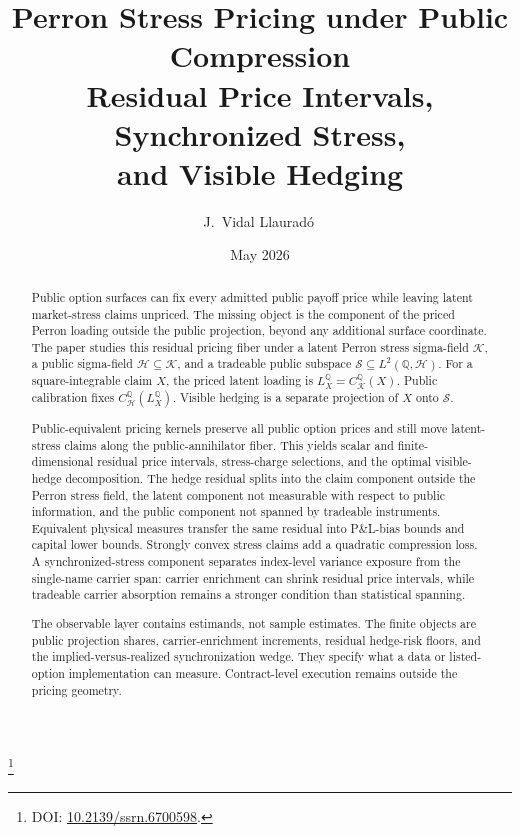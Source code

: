 \documentclass[11pt,a4paper]{amsart}
\theoremstyle{plain}
\theoremstyle{definition}
\theoremstyle{remark}
\newcommand{\QQ}{\mathbb{Q}}
\newcommand{\cH}{\mathcal{H}}
\newcommand{\cK}{\mathcal{K}}
\newcommand{\cS}{\mathcal{S}}
\begin{document}
\title[Perron Stress Pricing]{%
Perron Stress Pricing under Public Compression\\[0.3em]
{\small Residual Price Intervals, Synchronized Stress,\\[0.1em] and Visible Hedging}}
\author[J.~Vidal Llaurad\'o]{J.~Vidal Llaurad\'o\,}
\thanks{DOI: \href{https://doi.org/10.2139/ssrn.6700598}{10.2139/ssrn.6700598}.}
\date{May 2026}

\begin{abstract}
Public option surfaces can fix every admitted public payoff price while leaving latent
market-stress claims unpriced.  The missing object is the component of the priced Perron loading
outside the public projection, beyond any additional surface coordinate.  The paper studies this
residual pricing fiber under a latent Perron stress sigma-field \(\cK\), a public sigma-field
\(\cH\subseteq\cK\), and a tradeable public subspace \(\cS\subseteq L^2(\QQ,\cH)\).  For a
square-integrable claim \(X\), the priced latent loading is \(L_X^\QQ=C_{\cK}^{\QQ}(X)\).  Public
calibration fixes \(C_{\cH}^{\QQ}(L_X^\QQ)\).  Visible hedging is a separate projection of \(X\)
onto \(\cS\).

Public-equivalent pricing kernels preserve all public option prices and still move latent-stress
claims along the public-annihilator fiber.  This yields scalar and finite-dimensional residual price
intervals, stress-charge selections, and the optimal visible-hedge decomposition.  The hedge
residual splits into the claim component outside the Perron stress field, the latent component not
measurable with respect to public information, and the public component not spanned by tradeable
instruments.  Equivalent physical measures transfer the same residual into P\&L-bias bounds and
capital lower bounds.  Strongly convex stress claims add a quadratic compression loss.  A
synchronized-stress component separates index-level variance exposure from the single-name carrier
span: carrier enrichment can shrink residual price intervals, while tradeable carrier absorption
remains a stronger condition than statistical spanning.

The observable layer contains estimands, not sample estimates.  The finite objects are public
projection shares, carrier-enrichment increments, residual hedge-risk floors, and the
implied-versus-realized synchronization wedge.  They specify what a data or listed-option
implementation can measure.  Contract-level execution remains outside the pricing geometry.
\end{abstract}
\end{document}
